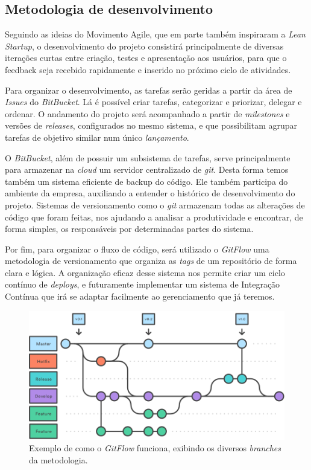 \documentclass[12pt,a4paper,twoside,hyphens,english,brazil]{abntex2}
\begin{document}
\subsection{Metodologia de desenvolvimento}
Seguindo as ideias do Movimento Agile\cite{agile}, que em parte também inspiraram a \emph{Lean Startup}, o desenvolvimento do projeto consistirá principalmente de diversas iterações curtas entre criação, testes e apresentação aos usuários, para que o feedback seja recebido rapidamente e inserido no próximo ciclo de atividades.

Para organizar o desenvolvimento, as tarefas serão geridas a partir da área de \emph{Issues} do \emph{BitBucket}. Lá é possível criar tarefas, categorizar e priorizar, delegar e ordenar. O andamento do projeto será acompanhado a partir de \emph{milestones} e versões de \emph{releases}, configurados no mesmo sistema, e que possibilitam agrupar tarefas de objetivo similar num único \emph{lançamento}.

O \emph{BitBucket}, além de possuir um subsistema de tarefas, serve principalmente para armazenar na \emph{cloud} um servidor centralizado de \emph{git}. Desta forma temos também um sistema eficiente de backup do código. Ele também participa do ambiente da empresa, auxiliando a entender o histórico de desenvolvimento do projeto. Sistemas de versionamento como o \emph{git} armazenam todas as alterações de código que foram feitas, nos ajudando a analisar a produtividade e encontrar, de forma simples, os responsáveis por determinadas partes do sistema.

Por fim, para organizar o fluxo de código, será utilizado o \emph{GitFlow}\cite{gitflow} uma metodologia de versionamento que organiza as \emph{tags} de um repositório de forma clara e lógica. A organização eficaz desse sistema nos permite criar um ciclo contínuo de \emph{deploys}, e futuramente implementar um sistema de Integração Contínua\footnotemark{} que irá se adaptar facilmente ao gerenciamento que já teremos.


\begin{figure}[!hb]
	\centering
	\includegraphics[width=0.8\linewidth]{imagens/gitflow-horizontal.png}
	\caption{Exemplo de como o \emph{GitFlow} funciona, exibindo os diversos \emph{branches} da metodologia.}
\end{figure}
\end{document}

